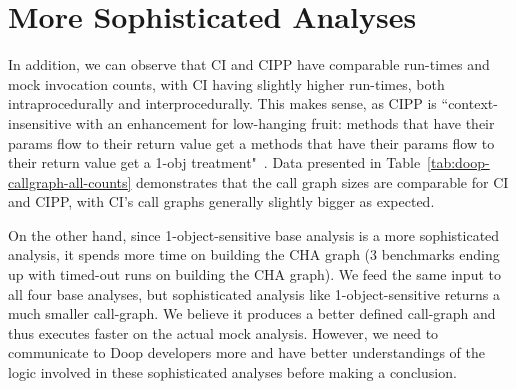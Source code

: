 \section{More Sophisticated Analyses}

In addition, we can observe that CI and CIPP have comparable run-times and mock invocation counts, with CI having slightly higher run-times, both intraprocedurally and interprocedurally. This makes sense, as CIPP is ``context-insensitive with an enhancement for low-hanging fruit: methods that have their params flow to their return value get a methods that have their params flow to their return value get a 1-obj treatment"~\cite{yanniss}. Data presented in Table~\ref{tab:doop-callgraph-all-counts} demonstrates that the call graph sizes are comparable for CI and CIPP, with CI's call graphs generally slightly bigger as expected.

On the other hand, since 1-object-sensitive base analysis is a more sophisticated analysis, it spends more time on building the CHA graph (3 benchmarks ending up with timed-out runs on building the CHA graph). We feed the same input to all four base analyses, but sophisticated analysis like 1-object-sensitive returns a much smaller call-graph. We believe it produces a better defined call-graph and thus executes faster on the actual mock analysis. However, we need to communicate to Doop developers more and have better understandings of the logic involved in these sophisticated analyses before making a conclusion.



